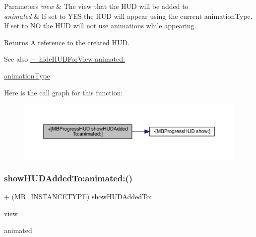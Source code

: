 \begin{DoxyParams}{Parameters}
{\em view} & The view that the H\+UD will be added to \\
\hline
{\em animated} & If set to Y\+ES the H\+UD will appear using the current animation\+Type. If set to NO the H\+UD will not use animations while appearing. \\
\hline
\end{DoxyParams}
\begin{DoxyReturn}{Returns}
A reference to the created H\+UD.
\end{DoxyReturn}
\begin{DoxySeeAlso}{See also}
\mbox{\hyperlink{interface_m_b_progress_h_u_d_a7b0826c34eea1a15d62aabd00c249666}{+ hide\+H\+U\+D\+For\+View\+:animated\+:}} 

\mbox{\hyperlink{interface_m_b_progress_h_u_d_a71d04bb9e2839df9377ad10d03b2e468}{animation\+Type}} 
\end{DoxySeeAlso}
Here is the call graph for this function\+:\nopagebreak
\begin{figure}[H]
\begin{center}
\leavevmode
\includegraphics[width=350pt]{interface_m_b_progress_h_u_d_a2a981df80fbbb85db0d6c660d5882292_cgraph}
\end{center}
\end{figure}
\mbox{\label{interface_m_b_progress_h_u_d_a2a981df80fbbb85db0d6c660d5882292}} 
\subsubsection{\texorpdfstring{show\+H\+U\+D\+Added\+To\+:animated\+:()}{showHUDAddedTo:animated:()}\hspace{0.1cm}{\footnotesize\ttfamily [3/3]}}
{\footnotesize\ttfamily + (M\+B\+\_\+\+I\+N\+S\+T\+A\+N\+C\+E\+T\+Y\+PE) show\+H\+U\+D\+Added\+To\+: \begin{DoxyParamCaption}\item[{(U\+I\+View $\ast$)}]{view }\item[{animated:(B\+O\+OL)}]{animated }\end{DoxyParamCaption}}

